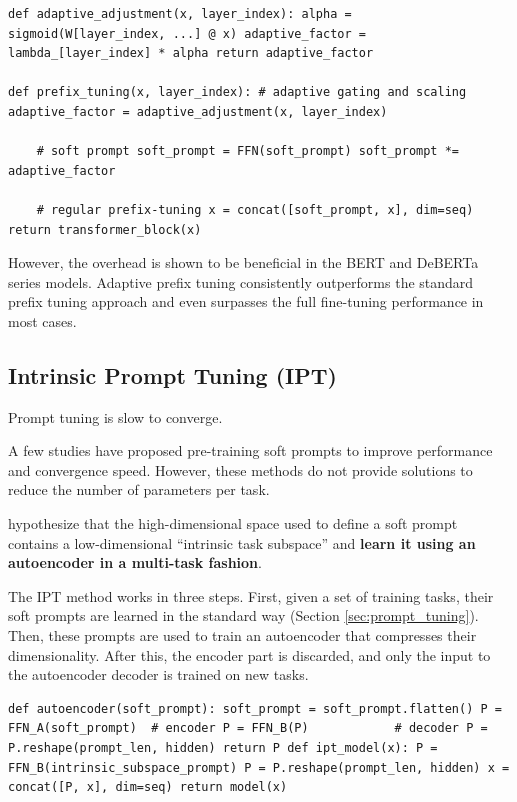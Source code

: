 \begin{lstlisting}
def adaptive_adjustment(x, layer_index): alpha = sigmoid(W[layer_index, ...] @ x) adaptive_factor = lambda_[layer_index] * alpha return adaptive_factor

def prefix_tuning(x, layer_index): # adaptive gating and scaling adaptive_factor = adaptive_adjustment(x, layer_index)

    # soft prompt soft_prompt = FFN(soft_prompt) soft_prompt *= adaptive_factor

    # regular prefix-tuning x = concat([soft_prompt, x], dim=seq) return transformer_block(x)
\end{lstlisting}

However, the overhead is shown to be beneficial in the BERT and DeBERTa series models. Adaptive prefix tuning consistently outperforms the standard prefix tuning approach and even surpasses the full fine-tuning performance in most cases.

\subsection{Intrinsic Prompt Tuning (IPT)} Prompt tuning is slow to converge.

A few studies \citep{prompt_mapping,spot} have proposed pre-training soft prompts to improve performance and convergence speed. However, these methods do not provide solutions to reduce the number of parameters per task.

\citet{ipt} hypothesize that the high-dimensional space used to define a soft prompt contains a low-dimensional ``intrinsic task subspace'' and \textbf{learn it using an autoencoder in a multi-task fashion}.

The IPT method works in three steps. First, given a set of training tasks, their soft prompts are learned in the standard way (Section \ref{sec:prompt_tuning}). Then, these prompts are used to train an autoencoder that compresses their dimensionality. After this, the encoder part is discarded, and only the input to the autoencoder decoder is trained on new tasks.

\begin{lstlisting}
def autoencoder(soft_prompt): soft_prompt = soft_prompt.flatten() P = FFN_A(soft_prompt)  # encoder P = FFN_B(P)            # decoder P = P.reshape(prompt_len, hidden) return P def ipt_model(x): P = FFN_B(intrinsic_subspace_prompt) P = P.reshape(prompt_len, hidden) x = concat([P, x], dim=seq) return model(x)
\end{lstlisting}

